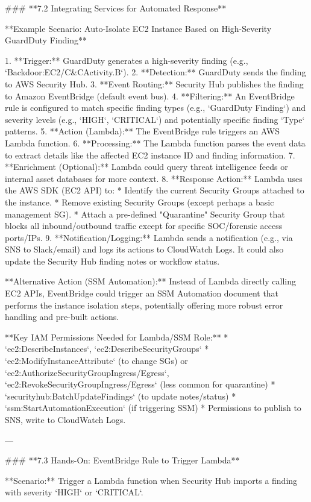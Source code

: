 \documentclass{article}
\begin{document}
### **7.2 Integrating Services for Automated Response**

**Example Scenario: Auto-Isolate EC2 Instance Based on High-Severity GuardDuty Finding**

1.  **Trigger:** GuardDuty generates a high-severity finding (e.g., `Backdoor:EC2/C&CActivity.B`).
2.  **Detection:** GuardDuty sends the finding to AWS Security Hub.
3.  **Event Routing:** Security Hub publishes the finding to Amazon EventBridge (default event bus).
4.  **Filtering:** An EventBridge rule is configured to match specific finding types (e.g., `GuardDuty Finding`) and severity levels (e.g., `HIGH`, `CRITICAL`) and potentially specific finding `Type` patterns.
5.  **Action (Lambda):** The EventBridge rule triggers an AWS Lambda function.
6.  **Processing:** The Lambda function parses the event data to extract details like the affected EC2 instance ID and finding information.
7.  **Enrichment (Optional):** Lambda could query threat intelligence feeds or internal asset databases for more context.
8.  **Response Action:** Lambda uses the AWS SDK (EC2 API) to:
    * Identify the current Security Groups attached to the instance.
    * Remove existing Security Groups (except perhaps a basic management SG).
    * Attach a pre-defined "Quarantine" Security Group that blocks all inbound/outbound traffic except for specific SOC/forensic access ports/IPs.
9.  **Notification/Logging:** Lambda sends a notification (e.g., via SNS to Slack/email) and logs its actions to CloudWatch Logs. It could also update the Security Hub finding notes or workflow status.

**Alternative Action (SSM Automation):** Instead of Lambda directly calling EC2 APIs, EventBridge could trigger an SSM Automation document that performs the instance isolation steps, potentially offering more robust error handling and pre-built actions.

**Key IAM Permissions Needed for Lambda/SSM Role:**
* `ec2:DescribeInstances`, `ec2:DescribeSecurityGroups`
* `ec2:ModifyInstanceAttribute` (to change SGs) or `ec2:AuthorizeSecurityGroupIngress/Egress`, `ec2:RevokeSecurityGroupIngress/Egress` (less common for quarantine)
* `securityhub:BatchUpdateFindings` (to update notes/status)
* `ssm:StartAutomationExecution` (if triggering SSM)
* Permissions to publish to SNS, write to CloudWatch Logs.

---

### **7.3 Hands-On: EventBridge Rule to Trigger Lambda**

**Scenario:** Trigger a Lambda function when Security Hub imports a finding with severity `HIGH` or `CRITICAL`.
\end{document}
